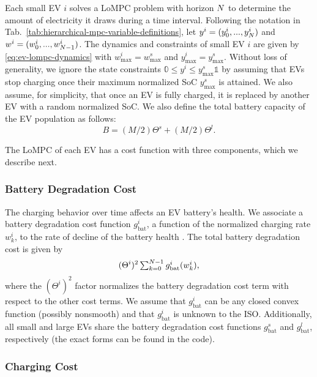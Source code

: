 Each small EV $i$ solves a LoMPC problem with horizon $N$ to determine the amount of electricity it draws during a time interval.
Following the notation in Tab.~\ref{tab:hierarchical-mpc-variable-definitions}, let $y^i = (y^i_0, ..., y^i_{N})$ and $w^i = (w^i_0, ..., w^i_{N-1})$.
The dynamics and constraints of small EV $i$ are given by \eqref{eq:ev-lompc-dynamics} with $w^i_\text{max} = w^s_\text{max}$ and $y^i_\text{max} = y^s_\text{max}$.
Without loss of generality, we ignore the state constraints $\mathbb{0} \leq y^i \! \leq y^s_\text{max} \mathbb{1}$ by assuming that EVs stop charging once their maximum normalized SoC $y^s_\text{max}$ is attained.
We also assume, for simplicity, that once an EV is fully charged, it is replaced by another EV with a random normalized SoC.
We also define the total battery capacity of the EV population as follows:
\begin{equation}
\label{eq:ev-lompc-b}
    B = (M/2) \Theta^s + (M/2) \Theta^l.
\end{equation}

The LoMPC of each EV has a cost function with three components, which we describe next.

\subsubsection{Battery Degradation Cost}

The charging behavior over time affects an EV battery's health.
We associate a battery degradation cost function $g^i_\text{bat}$, a function of the normalized charging rate $w^i_k$, to the rate of decline of the battery health \cite{zou2017efficient}.
The total battery degradation cost is given by
\begin{equation}
\label{eq:ev-lompc-battery-degradation-cost}
    (\Theta^i)^2 \, \textstyle{\sum}_{k=0}^{N-1} \, g^i_\text{bat}(w^i_k),
\end{equation}
where the $(\Theta^i)^2$ factor normalizes the battery degradation cost term with respect to the other cost terms.
We assume that $g^i_\text{bat}$ can be any closed convex function (possibly nonsmooth) and that $g^i_\text{bat}$ is unknown to the ISO.
Additionally, all small and large EVs share the battery degradation cost functions $g^s_\text{bat}$ and $g^l_\text{bat}$, respectively (the exact forms can be found in the code).

\subsubsection{Charging Cost}

